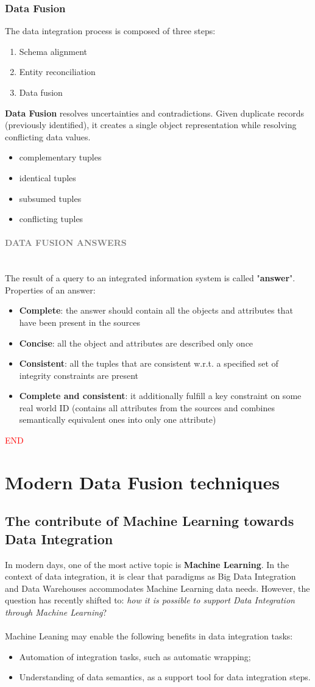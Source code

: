 \documentclass[10pt,a4paper]{article}
\newcommand{\nline}{\\~\\}
\newcommand{\myparagraph}[1]{\paragraph{\normalsize{\textcolor{gray}{\uppercase{\textbf{#1}}}} }\mbox{} \vspace{0.5em}\\}
\begin{document}
\begin{justify}
\subsubsection{Data Fusion}
The data integration process is composed of three steps:
\begin{enumerate}
	\item Schema alignment
	\item Entity reconciliation
	\item Data fusion
\end{enumerate}
\textbf{Data Fusion} resolves uncertainties and contradictions. Given duplicate records (previously identified), it creates a single object representation while resolving conflicting data values.
\begin{itemize}
	\item complementary tuples
	\item identical tuples
	\item subsumed tuples
	\item conflicting tuples
\end{itemize}
\myparagraph{Data Fusion ANSWERS}
The result of a query to an integrated information system is called "\textbf{answer}". \\ 
Properties of an answer:
\begin{itemize}
	\item \textbf{Complete}: the answer should contain all the objects and attributes that have been present in the sources
	\item \textbf{Concise}: all the object and attributes are described only once
	\item \textbf{Consistent}: all the tuples that are consistent w.r.t. a specified set of integrity constraints are present
	\item \textbf{Complete and consistent}: it additionally fulfill a key constraint on some real world ID (contains all attributes from the sources and combines semantically equivalent ones into only one attribute)
\end{itemize}
\textcolor{red}{END}
\pagebreak
\section{Modern Data Fusion techniques}
\subsection{The contribute of Machine Learning towards Data Integration}
In modern days, one of the most active topic is \textbf{Machine Learning}. In the context of data integration, it is clear that paradigms as Big Data Integration and Data Warehouses accommodates Machine Learning data needs. However, the question has recently shifted to: \textit{how it is possible to support Data Integration through Machine Learning}?\nline
Machine Leaning may enable the following benefits in data integration tasks:
\begin{itemize}
    \item Automation of integration tasks, such as automatic wrapping;
    \item Understanding of data semantics, as a support tool for data integration steps.
\end{itemize}

\end{justify}
\end{document}
